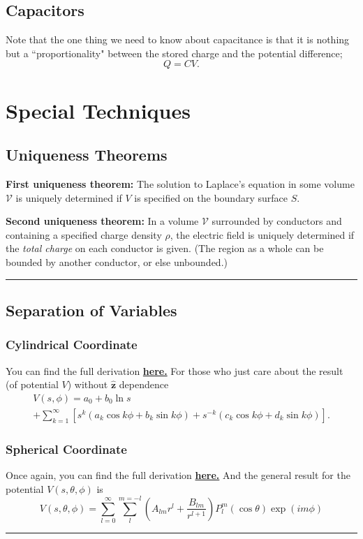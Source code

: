 \documentclass[12pt,english]{article}
\numberwithin{equation}{subsection}
\let\oldhat\hat
\renewcommand{\hat}[1]{\oldhat{\mathbf{#1}}}
\begin{document}
\subsection{Capacitors}
Note that the one thing we need to know about capacitance is that it is nothing but a ``proportionality" between the stored charge and the potential difference;
\begin{equation*}
    Q = CV.
\end{equation*}


\section{Special Techniques}
\subsection{Uniqueness Theorems}
\textbf{First uniqueness theorem:} The solution to Laplace's equation in some volume $\mathcal{V}$ is uniquely determined if $V$ is specified on the boundary surface $S$.

\textbf{Second uniqueness theorem:} In a volume $\mathcal{V}$ surrounded by conductors and containing a specified charge density $\rho$, the electric field is uniquely determined if the \textit{total charge} on each conductor is given. (The region as a whole can be bounded by another conductor, or else unbounded.)\cite{Griffiths:611579}
\par\noindent\rule{\textwidth}{0.4pt}
\subsection{Separation of Variables}
\subsubsection{Cylindrical Coordinate}
You can find the full derivation \href{http://faculty.washington.edu/blayneh/cylcoord.pdf}{\textbf{here.}} For those who just care about the result (of potential $V$) without $\hat{z}$ dependence
\begin{multline}
    V(s,\phi) = a_0 + b_0 \ln s\\
    + \sum_{k=1}^{\infty} \left[ s^k ( a_k \cos k \phi + b_k \sin k \phi) + s^{-k} (c_k \cos k \phi + d_k \sin k \phi) \right].
\end{multline}

\subsubsection{Spherical Coordinate}
Once again, you can find the full derivation \href{http://www.physics.usu.edu/Wheeler/EM3600/Notes11SeparationOfVariablesSpherical.pdf}{\textbf{here.}} And the general result for the potential $V(s, \theta, \phi)$ is
\begin{equation}
    V(s, \theta, \phi) = \sum_{l = 0}^{\infty} \sum_{l}^{m=-l} \left(A_{lm}r^l + \frac{B_{lm}}{r^{l+1}} \right) P_{l}^{m}(\cos \theta) \exp(im\phi)
\end{equation}
\par\noindent\rule{\textwidth}{0.4pt}
\end{document}
